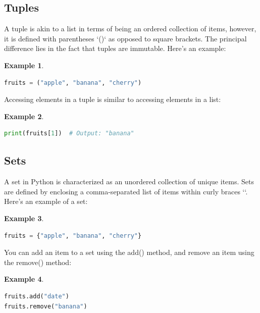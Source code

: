 \documentclass[12pt]{article}
\newtheorem{Example}{Example}[section]
\begin{document}
\subsection{Tuples}
A tuple is akin to a list in terms of being an ordered collection of items, however, it is defined with parentheses `()` as opposed to square brackets. The principal difference lies in the fact that tuples are immutable. Here's an example:
\begin{Example}
\begin{lstlisting}[language=Python]
fruits = ("apple", "banana", "cherry")
\end{lstlisting}
\end{Example}
Accessing elements in a tuple is similar to accessing elements in a list:
\begin{Example}
\begin{lstlisting}[language=Python]
print(fruits[1])  # Output: "banana"
\end{lstlisting}
\end{Example}

\subsection{Sets}
A set in Python is characterized as an unordered collection of unique items. Sets are defined by enclosing a comma-separated list of items within curly braces `{}`. Here's an example of a set:
\begin{Example}
\begin{lstlisting}[language=Python]
fruits = {"apple", "banana", "cherry"}
\end{lstlisting}
\end{Example}
You can add an item to a set using the add() method, and remove an item using the remove() method:
\begin{Example}
\begin{lstlisting}[language=Python]
fruits.add("date")
fruits.remove("banana")
\end{lstlisting}
\end{Example}
\end{document}
